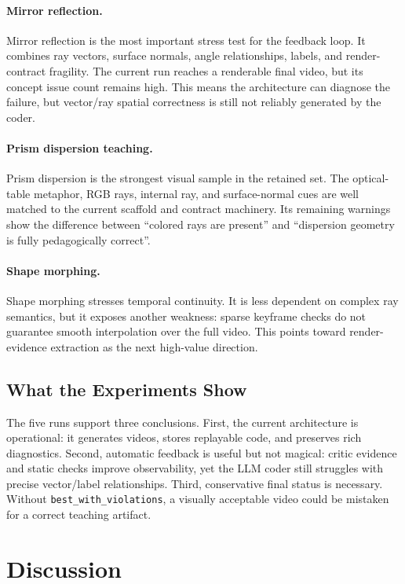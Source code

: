 \documentclass[10pt,letterpaper]{article}
\begin{document}
\paragraph{Mirror reflection.}
Mirror reflection is the most important stress test for the feedback loop.
It combines ray vectors, surface normals, angle relationships, labels, and
render-contract fragility. The current run reaches a renderable final video,
but its concept issue count remains high. This means the architecture can
diagnose the failure, but vector/ray spatial correctness is still not
reliably generated by the coder.

\paragraph{Prism dispersion teaching.}
Prism dispersion is the strongest visual sample in the retained set. The
optical-table metaphor, RGB rays, internal ray, and surface-normal cues are
well matched to the current scaffold and contract machinery. Its remaining
warnings show the difference between ``colored rays are present'' and
``dispersion geometry is fully pedagogically correct''.

\paragraph{Shape morphing.}
Shape morphing stresses temporal continuity. It is less dependent on complex
ray semantics, but it exposes another weakness: sparse keyframe checks do not
guarantee smooth interpolation over the full video. This points toward
render-evidence extraction as the next high-value direction.

\subsection{What the Experiments Show}

The five runs support three conclusions. First, the current architecture is
operational: it generates videos, stores replayable code, and preserves rich
diagnostics. Second, automatic feedback is useful but not magical: critic
evidence and static checks improve observability, yet the LLM coder still
struggles with precise vector/label relationships. Third, conservative final
status is necessary. Without \texttt{best\_with\_violations}, a visually
acceptable video could be mistaken for a correct teaching artifact.

\section{Discussion}
\label{sec:discussion}
\end{document}
